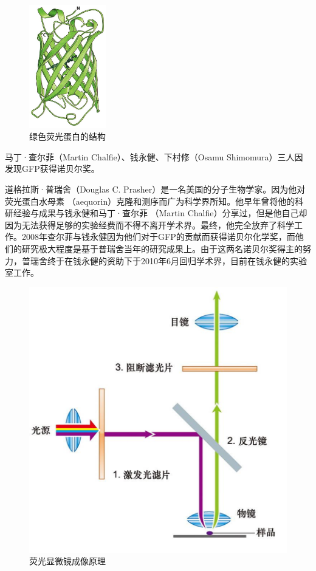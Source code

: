 \begin{figure}[htbp]
	\centering
	\includegraphics[width=0.3\textwidth]{Pics/GFP}
	\caption{绿色荧光蛋白的结构}
	\label{fig:gfp}
\end{figure}

\begin{gs}[：GFP与诺贝尔奖]

	\hspace{2em}马丁·查尔菲（Martin Chalfie）、钱永健、下村修（Osamu Shimomura）三人因发现GFP获得诺贝尔奖。

	\hspace{2em}道格拉斯·普瑞舍（Douglas C. Prasher）是一名美国的分子生物学家。因为他对荧光蛋白水母素 （aequorin）克隆和测序而广为科学界所知。他早年曾将他的科研经验与成果与钱永健和马丁·查尔菲 （Martin Chalfie）分享过，但是他自己却因为无法获得足够的实验经费而不得不离开学术界。最终，他完全放弃了科学工作。2008年查尔菲与钱永健因为他们对于GFP的贡献而获得诺贝尔化学奖，而他们的研究极大程度是基于普瑞舍当年的研究成果上。由于这两名诺贝尔奖得主的努力，普瑞舍终于在钱永健的资助下于2010年6月回归学术界，目前在钱永健的实验室工作。
\end{gs}

\begin{figure}[htbp]
	\centering
	\includegraphics[width=0.4\linewidth]{Pics/荧光显微镜成像原理}
	\caption{荧光显微镜成像原理}
	\label{fig:fluorescenceMicroscopeImagingPrinciple}
\end{figure}

